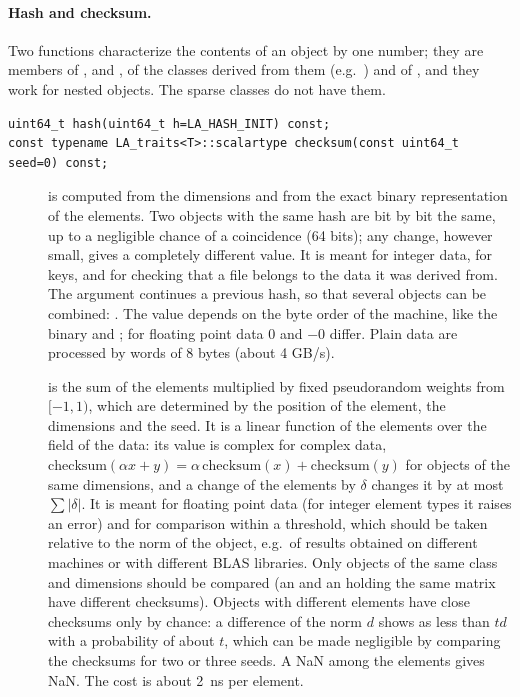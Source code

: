 \paragraph{Hash and checksum.} Two functions characterize the contents of an object by one number; they are members of
,  and , of the classes derived from them (e.g.\ ) and of
, and they work for nested objects. The sparse classes do not have them.
\begin{lstlisting}
uint64_t hash(uint64_t h=LA_HASH_INIT) const;
const typename LA_traits<T>::scalartype checksum(const uint64_t seed=0) const;
\end{lstlisting}
\begin{description}
\item[] is computed from the dimensions and from the exact binary representation of the elements. Two
	objects with the same hash are bit by bit the same, up to a negligible chance of a coincidence (64 bits); any
	change, however small, gives a completely different value. It is meant for integer data, for keys, and for
	checking that a file belongs to the data it was derived from. The argument continues a previous hash, so that
	several objects can be combined: . The value depends on the byte order of the
	machine, like the binary  and ; for floating point data $0$ and $-0$ differ. Plain data are
	processed by words of 8 bytes (about 4 GB/s).
\item[] is the sum of the elements multiplied by fixed pseudorandom weights from $[-1,1)$, which are
	determined by the position of the element, the dimensions and the seed. It is a linear function of the
	elements over the field of the data: its value is complex for complex data,
	$\mathrm{checksum}(\alpha x+y)=\alpha\,\mathrm{checksum}(x)+\mathrm{checksum}(y)$ for objects of the same
	dimensions, and a change of the elements by $\delta$ changes it by at most $\sum|\delta|$. It is meant for
	floating point data (for integer element types it raises an error) and for comparison within a threshold, which
	should be taken relative to the norm of the object, e.g.\ of results obtained on different machines or with
	different BLAS libraries. Only objects of the same class and dimensions should be compared (an  and an
	 holding the same matrix have different checksums). Objects with different elements have close
	checksums only by chance: a difference of the norm $d$ shows as less than $td$ with a probability of about $t$,
	which can be made negligible by comparing the checksums for two or three seeds. A NaN among the elements gives NaN.
	The cost is about 2~ns per element.
\end{description}
